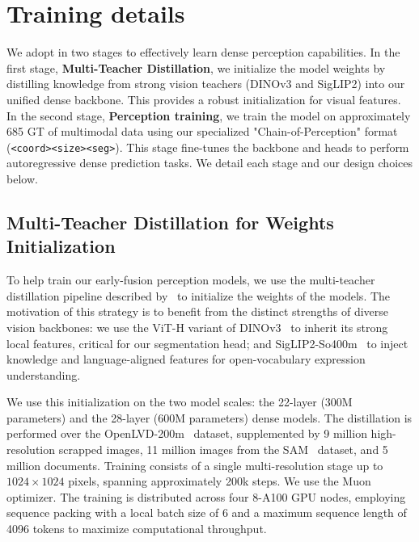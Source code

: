 
\section{Training details}
\label{sec:training}
\noindent We adopt in two stages to effectively learn dense perception capabilities. In the first stage, \textbf{Multi-Teacher Distillation}, we initialize the model weights by distilling knowledge from strong vision teachers (DINOv3 and SigLIP2) into our unified dense backbone. This provides a robust initialization for visual features. In the second stage, \textbf{Perception training}, we train the model on approximately 685 GT of multimodal data using our specialized "Chain-of-Perception" format (\texttt{<coord><size><seg>}). This stage fine-tunes the backbone and heads to perform autoregressive dense prediction tasks. We detail each stage and our design choices below.


\subsection{Multi-Teacher Distillation for Weights Initialization\label{sec:mtd}}

To help train our early-fusion perception models, we use the multi-teacher distillation pipeline described by~\citep{chaybouti2025amoe} to initialize the weights of the models. The motivation of this strategy is to benefit from the distinct strengths of diverse vision backbones: we use the ViT-H variant of DINOv3~\citep{simeoni2025dinov3} to inherit its strong local features, critical for our segmentation head; and SigLIP2-So400m~\citep{tschannen2025siglip} to inject knowledge and language-aligned features for open-vocabulary expression understanding.

\noindent We use this initialization on the two model scales: the 22-layer (300M parameters) and the 28-layer (600M parameters) dense models. The distillation is performed over the OpenLVD-200m~\citep{chaybouti2025amoe} dataset, supplemented by 9 million high-resolution scrapped images, 11 million images from the SAM~\citep{kirillov2023segment} dataset, and 5 million documents. Training consists of a single multi-resolution stage up to $1024 \times 1024$ pixels, spanning approximately \num{200}k steps. We use the Muon~\citep{jordan2024muon} optimizer. The training is distributed across four 8-A100 GPU nodes, employing sequence packing with a local batch size of 6 and a maximum sequence length of \num{4096} tokens to maximize computational throughput.

